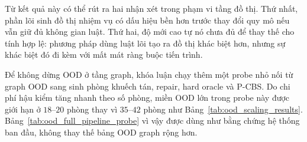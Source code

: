 \documentclass[oneside,a4paper,12pt]{extreport}
\begin{document}
\begin{table}[H]
\centering
\small
\setlength{\tabcolsep}{4pt}
\renewcommand{\arraystretch}{1.08}
\caption{Kết quả OOD ở tầng đồ thị nhiệm vụ}
\label{tab:ood_scaling_results}
\end{table}

Từ kết quả này có thể rút ra hai nhận xét trong phạm vi tầng đồ thị. Thứ nhất, phần lõi sinh đồ thị nhiệm vụ có dấu hiệu bền hơn trước thay đổi quy mô nếu vẫn giữ đủ không gian luật. Thứ hai, độ mới cao tự nó chưa đủ để thay thế cho tính hợp lệ: phương pháp dùng luật lõi tạo ra đồ thị khác biệt hơn, nhưng sự khác biệt đó đi kèm với mất mát ràng buộc tiến trình.

Để không dừng OOD ở tầng graph, khóa luận chạy thêm một probe nhỏ nối từ graph OOD sang sinh phòng khuếch tán, repair, hard oracle và P-CBS. Do chi phí hậu kiểm tăng nhanh theo số phòng, miền OOD lớn trong probe này được giới hạn ở $18$--$20$ phòng thay vì $35$--$42$ phòng như Bảng~\ref{tab:ood_scaling_results}. Bảng~\ref{tab:ood_full_pipeline_probe} vì vậy được dùng như bằng chứng hệ thống ban đầu, không thay thế bảng OOD graph rộng hơn.
\end{document}
